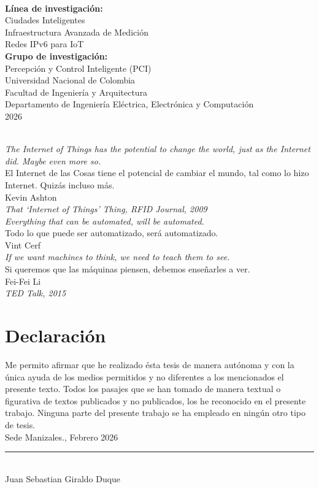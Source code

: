 \documentclass[10pt,spanish,fleqn,openany,twoside,letterpaper]{book}
\newcommand{\studentname}{}
\newcommand{\submissiondate}{}
\newcommand{\resgroupone}{}
\newcommand{\resgrouptwo}{}
\newcommand{\researchtopic}{}
\newcommand{\codirectortitle}{} %
\newcommand{\issuedate}{}
\newcommand{\sede}{}
\newcommand{\department}{}
\newcommand{\faculty}{}
\newcommand{\university}{Universidad Nacional de Colombia}
\renewcommand{\studentname}{Juan Sebastian Giraldo Duque}
\renewcommand{\issuedate}{2026}
\renewcommand{\submissiondate}{Febrero 2026}
\renewcommand{\codirectortitle}{}
\renewcommand{\resgroupone}{Percepción y Control Inteligente (PCI)}
\renewcommand{\resgrouptwo}{}
\renewcommand{\researchtopic}{Ciudades Inteligentes \\ Infraestructura Avanzada de Medición \\ Redes IPv6 para IoT}
\renewcommand{\sede}{Sede Manizales}
\renewcommand{\department}{Departamento de Ingeniería Eléctrica, Electrónica y Computación}
\renewcommand{\faculty}{Facultad de Ingeniería y Arquitectura}
\begin{document}
{\begin{center}
~\\
\textbf{Línea de investigación:} \\ 
\researchtopic\\
\textbf{Grupo de investigación:} \\
\resgroupone \\
\vspace{1.5cm} 
\university \\
\faculty \\
\department \\
\issuedate
\end{center}

\newpage
\thispagestyle{empty}
\begin{flushright}
\begin{minipage}{12.5cm}
\noindent
\\[6em]
{\Large \textit{The Internet of Things has the potential to change the world, just as the Internet did. Maybe even more so.}}
\\[0.5em]
El Internet de las Cosas tiene el potencial de cambiar el mundo, tal como lo hizo Internet. Quizás incluso más.
\\[2em]
Kevin Ashton
\\ \textit{That `Internet of Things' Thing, RFID Journal, 2009}
\\[5em]
{\Large \textit{Everything that can be automated, will be automated.}}
\\[0.5em]
Todo lo que puede ser automatizado, será automatizado.
\\[2em]
Vint Cerf
\\[5em]
{\Large \textit{If we want machines to think, we need to teach them to see.}}
\\[0.5em]
Si queremos que las máquinas piensen, debemos enseñarles a ver.
\\[2em]
Fei-Fei Li
\\ \textit{TED Talk, 2015}
\end{minipage}
\end{flushright} 

\newpage
\chapter*{\sffamily Declaración}
\par Me permito afirmar que he realizado ésta tesis de manera autónoma y con la única ayuda de los medios permitidos y no diferentes a los mencionados el presente texto. Todos los pasajes que se han tomado de manera textual o figurativa de textos publicados y no publicados, los he reconocido en el presente trabajo. Ninguna parte del presente trabajo se ha empleado en ningún otro tipo de tesis. 
\\[1em]
\sede., \submissiondate
\\[6em]
\rule{6cm}{0.5pt}\\
\studentname
}
\end{document}
